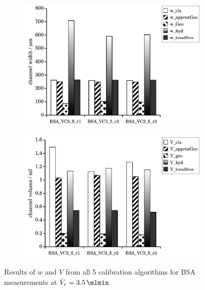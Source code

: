 \begin{figure}[h]
  \begin{center}
    \begin{subfigure}{0.49\linewidth}
      \includegraphics[width=\linewidth]{./images/data/img_calibW_BSA_VC_3_5.pdf}
      \label{subfig:calibRes_BSA_VC3_5_w}
    \end{subfigure}
    \begin{subfigure}{0.49\linewidth}
      \includegraphics[width=\linewidth]{./images/data/img_calibV_BSA_VC_3_5.pdf}
    \end{subfigure}
  \end{center}
  \vspace*{-3ex}    
  \caption[Results of $w$ and $V$ from all 5 calibration algorithms for BSA measurements at
  $\Vc = \SI{3.5}{\mlmin}$]{
    Results of $w$ and $V$ from all 5 calibration algorithms for BSA measurements at
    $\Vc = \SI{3.5}{\mlmin}$
  }
  \label{fig:calibRes_BSA_VC3_5}
\end{figure}
